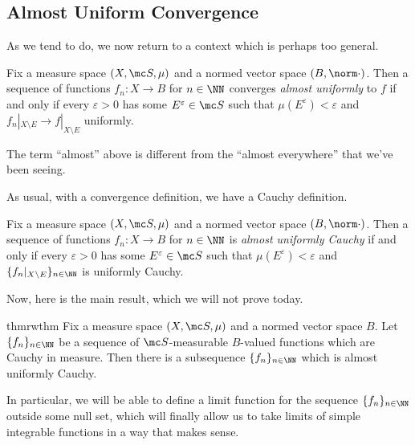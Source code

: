 \documentclass[../notes.tex]{subfiles}
\begin{document}
\subsection{Almost Uniform Convergence}
As we tend to do, we now return to a context which is perhaps too general.
\begin{definition}
	Fix a measure space $(X,\mc S,\mu)$ and a normed vector space $(B,\norm\cdot)$. Then a sequence of functions $f_n\colon X\to B$ for $n\in\NN$ converges \textit{almost uniformly} to $f$ if and only if every $\varepsilon>0$ has some $E^\varepsilon\in\mc S$ such that $\mu(E^\varepsilon)<\varepsilon$ and $f_n|_{X\setminus E}\to f|_{X\setminus E}$ uniformly.
\end{definition}
\begin{remark}
	The term ``almost'' above is different from the ``almost everywhere'' that we've been seeing.
\end{remark}
As usual, with a convergence definition, we have a Cauchy definition.
\begin{definition}
	Fix a measure space $(X,\mc S,\mu)$ and a normed vector space $(B,\norm\cdot)$. Then a sequence of functions $f_n\colon X\to B$ for $n\in\NN$ is \textit{almost uniformly Cauchy} if and only if every $\varepsilon>0$ has some $E^\varepsilon\in\mc S$ such that $\mu(E^\varepsilon)<\varepsilon$ and $\{f_n|_{X\setminus E}\}_{n\in\NN}$ is uniformly Cauchy.
\end{definition}
Now, here is the main result, which we will not prove today.
\begin{restatable}{thm}{rwthm} \label{thm:rw}
	Fix a measure space $(X,\mc S,\mu)$ and a normed vector space $B$. Let $\{f_n\}_{n\in\NN}$ be a sequence of $\mc S$-measurable $B$-valued functions which are Cauchy in measure. Then there is a subsequence $\{f_n\}_{n\in\NN}$ which is almost uniformly Cauchy.
\end{restatable}
\noindent In particular, we will be able to define a limit function for the sequence $\{f_n\}_{n\in\NN}$ outside some null set, which will finally allow us to take limits of simple integrable functions in a way that makes sense.
\end{document}
